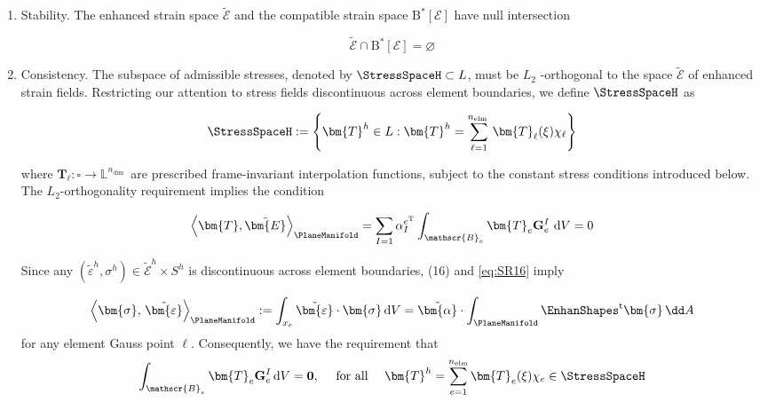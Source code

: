 \begin{enumerate}[label=\roman*]
    \item Stability. 
%
    The enhanced strain space $\tilde{\mathscr{E}}$ and the compatible strain space \(\operatorname{B^*}\left[\mathcal{E}\right]\) have null intersection
    
    $$
    \tilde{\mathscr{E}} \cap \operatorname{B^*}\left[\mathcal{E}\right]=\varnothing
    $$

    
\item Consistency. %
    The subspace of admissible stresses, denoted by $\StressSpaceH \subset L$, must be $L_2$ -orthogonal to the space $\tilde{\mathscr{E}}$ of enhanced strain fields. 
\iffalse 
    Restricting our attention to stress fields discontinuous across element boundaries, we define $\StressSpaceH$ as
    
    $$
    \StressSpaceH:=\left\{\bm{T}^h \in L: \bm{T}^h=\sum_{\ell=1}^{n_{\text {elm }}} \bm{T}_{\ell}(\xi) \chi_{\ell}
    \right\}
    $$
    
    where $\bm{T}_{\ell}: \square \rightarrow \mathbb{L}^{n_{\text {dim }}}$ are prescribed frame-invariant interpolation functions, subject to the constant stress conditions introduced below. 
    The $L_2$-orthogonality requirement implies the condition
    
    $$
    \left<\bm{T}, \tilde{\bm{E}}\right>_{\PlaneManifold}
    = \sum_{I=1} \alpha_I^{e^{\mathrm{T}}} \int_{\mathscr{B}_e} \bm{T}_e \mathbf{G}_e^I \mathrm{~d} V=0
    $$

    Since any $\left(\tilde{\varepsilon}^h, \sigma^h\right) \in \tilde{\mathscr{E}}^h \times S^h$ is discontinuous across element boundaries, (16) and \cref{eq:SR16} imply

    \begin{equation}
    \left<\bm{\sigma} ,\, \tilde{\bm{\varepsilon}} \right>_{\PlaneManifold}
    :=\int_{x_e} \tilde{\bm{\varepsilon}}  \cdot \bm{\sigma} \, \mathrm{d} V
    =\tilde{\bm{\alpha}} \cdot \int_{\PlaneManifold} \EnhanShapes^{\mathrm{t}} \bm{\sigma}  \, \dd A 
    \label{eq:20}
    \end{equation}
    for any element Gauss point $\ell$.
    Consequently, we have the requirement that
    \begin{equation}
    \int_{\mathscr{B}_e} \bm{T}_e \mathbf{G}_e^I \, \mathrm{d} V=\mathbf{0}, 
    \quad\text { for all } \quad
    \bm{T}^h=\sum_{e=1}^{n_{\mathrm{elm}}} \bm{T}_e(\xi) \chi_e \in \StressSpaceH
    \label{eq:45}
    \end{equation}
    

\end{enumerate}
